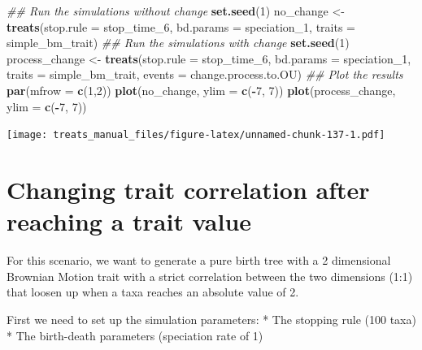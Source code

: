 \documentclass[
]{book}
\newenvironment{Shaded}{\begin{snugshade}}{\end{snugshade}}
\newcommand{\CommentTok}[1]{\textcolor[rgb]{0.56,0.35,0.01}{\textit{#1}}}
\newcommand{\DataTypeTok}[1]{\textcolor[rgb]{0.13,0.29,0.53}{#1}}
\newcommand{\DecValTok}[1]{\textcolor[rgb]{0.00,0.00,0.81}{#1}}
\newcommand{\KeywordTok}[1]{\textcolor[rgb]{0.13,0.29,0.53}{\textbf{#1}}}
\newcommand{\NormalTok}[1]{#1}
\newcommand{\OperatorTok}[1]{\textcolor[rgb]{0.81,0.36,0.00}{\textbf{#1}}}
\newcommand{\StringTok}[1]{\textcolor[rgb]{0.31,0.60,0.02}{#1}}
\begin{document}
\begin{Shaded}
\begin{Highlighting}[]
\CommentTok{\#\# Run the simulations without change}
\KeywordTok{set.seed}\NormalTok{(}\DecValTok{1}\NormalTok{)}
\NormalTok{no\_change \textless{}{-}}\StringTok{ }\KeywordTok{treats}\NormalTok{(}\DataTypeTok{stop.rule =}\NormalTok{ stop\_time\_}\DecValTok{6}\NormalTok{,}
                  \DataTypeTok{bd.params =}\NormalTok{ speciation\_}\DecValTok{1}\NormalTok{,}
                  \DataTypeTok{traits    =}\NormalTok{ simple\_bm\_trait)}
\CommentTok{\#\# Run the simulations with change}
\KeywordTok{set.seed}\NormalTok{(}\DecValTok{1}\NormalTok{)}
\NormalTok{process\_change \textless{}{-}}\StringTok{ }\KeywordTok{treats}\NormalTok{(}\DataTypeTok{stop.rule =}\NormalTok{ stop\_time\_}\DecValTok{6}\NormalTok{,}
                       \DataTypeTok{bd.params =}\NormalTok{ speciation\_}\DecValTok{1}\NormalTok{,}
                       \DataTypeTok{traits    =}\NormalTok{ simple\_bm\_trait,}
                       \DataTypeTok{events    =}\NormalTok{ change.process.to.OU)}
\CommentTok{\#\# Plot the results}
\KeywordTok{par}\NormalTok{(}\DataTypeTok{mfrow =} \KeywordTok{c}\NormalTok{(}\DecValTok{1}\NormalTok{,}\DecValTok{2}\NormalTok{))}
\KeywordTok{plot}\NormalTok{(no\_change, }\DataTypeTok{ylim =} \KeywordTok{c}\NormalTok{(}\OperatorTok{{-}}\DecValTok{7}\NormalTok{, }\DecValTok{7}\NormalTok{))}
\KeywordTok{plot}\NormalTok{(process\_change, }\DataTypeTok{ylim =} \KeywordTok{c}\NormalTok{(}\OperatorTok{{-}}\DecValTok{7}\NormalTok{, }\DecValTok{7}\NormalTok{))}
\end{Highlighting}
\end{Shaded}

\texttt{[image: treats\_manual\_files/figure-latex/unnamed-chunk-137-1.pdf]}

\hypertarget{EG_change_correlation}{%
\section{Changing trait correlation after reaching a trait value}\label{EG_change_correlation}}

For this scenario, we want to generate a pure birth tree with a 2 dimensional Brownian Motion trait with a strict correlation between the two dimensions (1:1) that loosen up when a taxa reaches an absolute value of 2.

First we need to set up the simulation parameters:
* The stopping rule (100 taxa)
* The birth-death parameters (speciation rate of 1)
\end{document}
